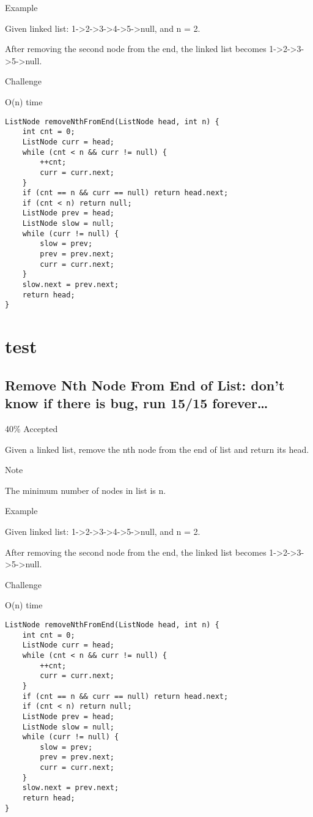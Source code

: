 \documentclass[9pt, b5paaper]{book}
\begin{document}
Example

Given linked list: 1->2->3->4->5->null, and n = 2.

After removing the second node from the end, the linked list becomes 1->2->3->5->null.

Challenge

O(n) time
\begin{verbatim}
ListNode removeNthFromEnd(ListNode head, int n) {
    int cnt = 0;
    ListNode curr = head;
    while (cnt < n && curr != null) {
        ++cnt;
        curr = curr.next;
    }
    if (cnt == n && curr == null) return head.next;
    if (cnt < n) return null;
    ListNode prev = head;
    ListNode slow = null;
    while (curr != null) {
        slow = prev;
        prev = prev.next;
        curr = curr.next;
    }
    slow.next = prev.next;
    return head;
}
\end{verbatim}
\chapter{test}
\label{sec-6}
\section{Remove Nth Node From End of List: don't know if there is bug, run 15/15 forever\ldots{}}
\label{sec-6-1}

40\% Accepted

Given a linked list, remove the nth node from the end of list and return its head.

Note

The minimum number of nodes in list is n.

Example

Given linked list: 1->2->3->4->5->null, and n = 2.

After removing the second node from the end, the linked list becomes 1->2->3->5->null.

Challenge

O(n) time
\begin{verbatim}
ListNode removeNthFromEnd(ListNode head, int n) {
    int cnt = 0;
    ListNode curr = head;
    while (cnt < n && curr != null) {
        ++cnt;
        curr = curr.next;
    }
    if (cnt == n && curr == null) return head.next;
    if (cnt < n) return null;
    ListNode prev = head;
    ListNode slow = null;
    while (curr != null) {
        slow = prev;
        prev = prev.next;
        curr = curr.next;
    }
    slow.next = prev.next;
    return head;
}
\end{verbatim}
\end{document}
